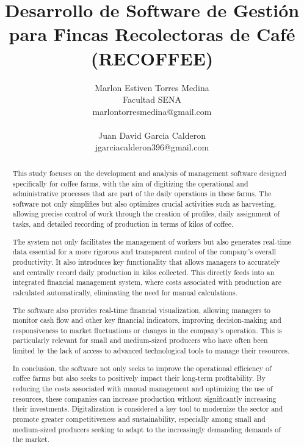 \documentclass[12pt]{article}
\begin{document}
\title{Desarrollo de Software de Gestión para Fincas Recolectoras de Café (RECOFFEE)}
\author{Marlon Estiven Torres Medina\\
Facultad SENA\\
marlontorresmedina@gmail.com\\
\\
Juan David Garcia Calderon\\
jgarciacalderon396@gmail.com}
\date{}
\maketitle


\begin{abstract}
This study focuses on the development and analysis of management software designed specifically for coffee farms, with the aim of digitizing the operational and administrative processes that are part of the daily operations in these farms. The software not only simplifies but also optimizes crucial activities such as harvesting, allowing precise control of work through the creation of profiles, daily assignment of tasks, and detailed recording of production in terms of kilos of coffee.

The system not only facilitates the management of workers but also generates real-time data essential for a more rigorous and transparent control of the company's overall productivity. It also introduces key functionality that allows managers to accurately and centrally record daily production in kilos collected. This directly feeds into an integrated financial management system, where costs associated with production are calculated automatically, eliminating the need for manual calculations.

The software also provides real-time financial visualization, allowing managers to monitor cash flow and other key financial indicators, improving decision-making and responsiveness to market fluctuations or changes in the company's operation. This is particularly relevant for small and medium-sized producers who have often been limited by the lack of access to advanced technological tools to manage their resources.

In conclusion, the software not only seeks to improve the operational efficiency of coffee farms but also seeks to positively impact their long-term profitability. By reducing the costs associated with manual management and optimizing the use of resources, these companies can increase production without significantly increasing their investments. Digitalization is considered a key tool to modernize the sector and promote greater competitiveness and sustainability, especially among small and medium-sized producers seeking to adapt to the increasingly demanding demands of the market.
\end{abstract}
\end{document}
